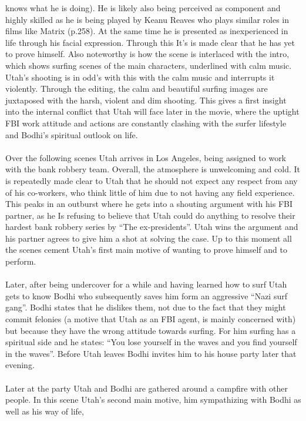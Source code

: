 \documentclass[fleqn,14pt]{article}
\begin{document}
knows what he is doing). He is likely also being perceived as component and highly skilled as he is being played by Keanu Reaves who plays similar roles in films like Matrix (p.258).
At the same time he is presented as inexperienced in life through his facial expression. Through this It's is made clear that he has yet to prove himself.  Also noteworthy is how the
scene is interlaced with the intro, which shows surfing scenes of the main characters, underlined with calm music. Utah's shooting is in odd's with this with the calm music and
interrupts it violently. Through the editing, the calm and beautiful surfing images are juxtaposed with the harsh, violent and dim shooting. This gives a first insight into the
internal conflict that Utah will face later in the movie, where the uptight FBI work attitude and actions are constantly clashing with the surfer lifestyle and Bodhi's spiritual
outlook on life. \\
\\
Over the following scenes Utah arrives in Los Angeles, being assigned to work with the bank robbery team. Overall, the atmosphere is unwelcoming and cold.
It is repeatedly made clear to Utah that he should not expect any respect from any of his co-workers, who think little of him due to not having any field experience.
This peaks in an outburst where he gets into a shouting argument with his FBI partner, as he Is refusing to believe that Utah could do anything to resolve their hardest bank robbery
series by “The ex-presidents”. Utah wins the argument and his partner agrees to give him a shot at solving the case. Up to this moment all the scenes cement Utah's first main motive
of wanting to prove himself and to perform. \\
\\
Later, after being undercover for a while and having learned how to surf Utah gets to know Bodhi who subsequently saves him form an aggressive “Nazi surf gang”. Bodhi
states that he dislikes them, not due to the fact that they might commit felonies (a motive that Utah as an FBI agent, is mainly concerned with) but because they have the wrong attitude 
towards surfing. For him surfing has a spiritual side and he states: “You lose yourself in the waves and you find yourself in the waves”. Before Utah leaves Bodhi invites him to his 
house party later that evening.\\
\\
Later at the party Utah and Bodhi are gathered around a campfire with other people. In this scene Utah's second main motive, him sympathizing with Bodhi as well as his way of life,
\end{document}
